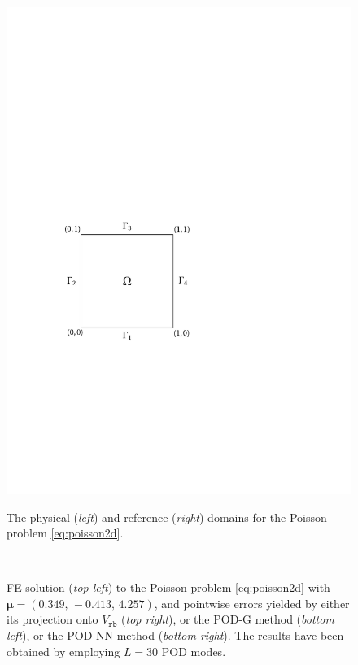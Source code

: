\documentclass[longtitle]{elsarticle}
\numberwithin{equation}{section}
\theoremstyle{theorem}
\theoremstyle{definition}
\theoremstyle{remark}
\theoremstyle{proposition}
\numberwithin{figure}{section}
\newcommand{\bg}[1]{\boldsymbol{#1}}
\begin{document}
\begin{figure}[b!]
\begin{minipage}{0.4\textwidth}
				\includegraphics[scale = 0.65, trim = {0 0 0 0}, clip]{bc_square_poster}
			\end{minipage}
			
			\vspace*{-0.3cm}
			
			\caption{The physical (\emph{left}) and reference (\emph{right}) domains for the Poisson problem \eqref{eq:poisson2d}.}
			\label{fig:poisson2d-fig1}

			\vspace*{-0.1cm}

			\center
			 \\[-0.7cm]
			
			
			\caption{FE solution (\emph{top left}) to the Poisson problem \eqref{eq:poisson2d} with $\bg{\mu} = (0.349, \, -0.413, \, 4.257)$, and pointwise errors yielded by either its projection onto $V_{\texttt{rb}}$ (\emph{top right}), or the POD-G method (\emph{bottom left}), or the POD-NN method (\emph{bottom right}). The results have been obtained by employing $L = 30$ POD modes.}
			\label{fig:poisson2d-fig2}
		\end{figure}
\end{document}
